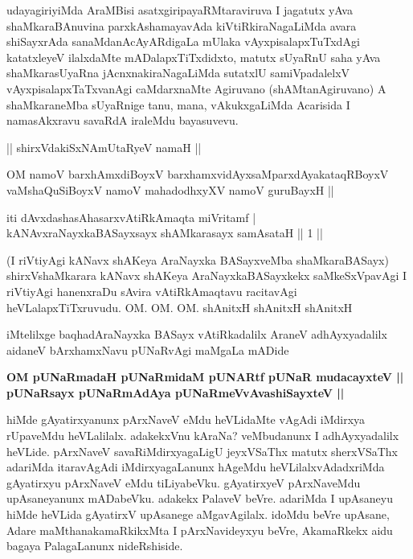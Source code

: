\begin{artha}
udayagiriyiMda AraMBisi asatxgiripayaRMtaraviruva I jagatutx yAva 
shaMkaraBAnuvina parxkAshamayavAda kiVtiRkiraNagaLiMda avara 
shiSayxrAda sanaMdanAcAyARdigaLa mUlaka vAyxpisalapxTuTxdAgi 
katatxleyeV ilalxdaMte mADalapxTiTxdidxto, matutx sUyaRnU saha yAva 
shaMkarasUyaRna jAcnxnakiraNagaLiMda sutatxlU samiVpadalelxV 
vAyxpisalapxTaTxvanAgi caMdarxnaMte Agiruvano (shAMtanAgiruvano) A 
shaMkaraneMba sUyaRnige tanu, mana, vAkukxgaLiMda Acarisida I 
namasAkxravu savaRdA iraleMdu bayasuvevu.
\end{artha}

\begin{center}
|| shirxVdakiSxNAmUtaRyeV namaH ||
\end{center}

\begin{shl}
OM namoV barxhAmxdiBoyxV barxhamxvidAyxsaMparxdAyakataqRBoyxV \\
vaMshaQuSiBoyxV namoV mahadodhxyXV namoV guruBayxH ||
\end{shl}

\begin{shl}
iti dAvxdashasAhasarxvAtiRkAmaqta miVritamf |\\
kANAvxraNayxkaBASayxsayx shAMkarasayx samAsataH \hfill|| 1 ||
\end{shl}

\begin{artha}
(I riVtiyAgi kANavx shAKeya AraNayxka BASayxveMba shaMkaraBASayx) 
shirxVshaMkarara kANavx shAKeya AraNayxkaBASayxkekx saMkeSxVpavAgi I 
riVtiyAgi hanenxraDu sAvira vAtiRkAmaqtavu racitavAgi 
heVLalapxTiTxruvudu. OM. OM. OM. shAnitxH shAnitxH shAnitxH
\end{artha}

\begin{center}
iMtelilxge baqhadAraNayxka BASayx vAtiRkadalilx AraneV adhAyxyadalilx 
aidaneV bArxhamxNavu pUNaRvAgi maMgaLa mADide
\end{center}

\begin{center}
\textbf{OM pUNaRmadaH pUNaRmidaM pUNARtf pUNaR mudacayxteV ||\\
pUNaRsayx pUNaRmAdAya pUNaRmeVvAvashiSayxteV ||} 
\end{center}

\centerline{}


\begin{artha}
hiMde gAyatirxyanunx pArxNaveV eMdu heVLidaMte vAgAdi iMdirxya rUpaveMdu heVLalilalx. adakekxVnu kAraNa? veMbudanunx I adhAyxyadalilx heVLide. pArxNaveV savaRiMdirxyagaLigU jeyxVSaThx matutx sherxVSaThx adariMda itaravAgAdi iMdirxyagaLanunx hAgeMdu heVLilalxvAdadxriMda gAyatirxyu pArxNaveV eMdu tiLiyabeVku. gAyatirxyeV pArxNaveMdu upAsaneyanunx mADabeVku. adakekx PalaveV beVre. adariMda I upAsaneyu hiMde heVLida gAyatirxV upAsanege aMgavAgilalx. idoMdu beVre upAsane, Adare maMthanakamaRkikxMta I pArxNavideyxyu beVre, AkamaRkekx aidu bagaya PalagaLanunx nideRshiside.
\end{artha}

